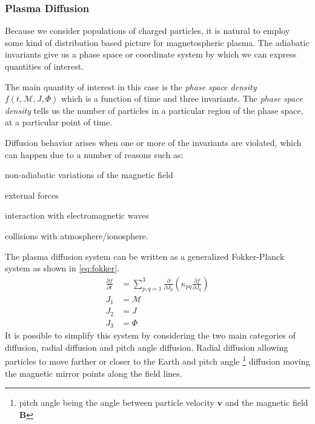 \subsubsection*{Plasma Diffusion}

Because we consider populations of charged particles, it is natural to employ some kind of 
distribution based picture for magnetospheric plasma. The adiabatic invariants give us a phase 
space or coordinate system by which we can express quantities of interest. 

The main quantity of interest in this case is the \emph{phase space density} 
$f(t, \mathcal{M}, J, \Phi)$ which is a function of time and three invariants. The 
\emph{phase space density} tells us the number of particles in a particular region of the phase 
space, at a particular point of time.

Diffusion behavior arises when one or more of the invariants are violated, which can happen due to 
a number of reasons such as: 
%
\begin{enumerate*}
    \item non-adiabatic variations of the magnetic field 
    \item external forces
    \item interaction with electromagnetic waves
    \item collisions with atmosphere/ionosphere. 
\end{enumerate*}
%
The plasma diffusion system \citep{schulz2012particle} can be written as a generalized 
Fokker-Planck system as shown in \cref{eq:fokker}.
%
\begin{align}\label{eq:fokker}
    \frac{\partial{f}}{\partial{t}} &= \sum^{3}_{p,q = 1}
    \frac{\partial}{\partial{J_{p}}} \left( \kappa_{pq}
    \frac{\partial{f}}{\partial{J_{q}}} \right) \\
    J_1 &= \mathcal{M} \\
    J_2 &= J \\
    J_{3} &= \Phi
\end{align}
%
It is possible to simplify this system by considering the two main categories of diffusion, radial 
diffusion and pitch angle diffusion. Radial diffusion allowing particles to move farther or closer 
to the Earth and pitch angle \footnote{pitch angle being the angle between particle velocity 
$\mathbf{v}$ and the magnetic field $\mathbf{B}$} diffusion moving the magnetic mirror points along 
the field lines.


